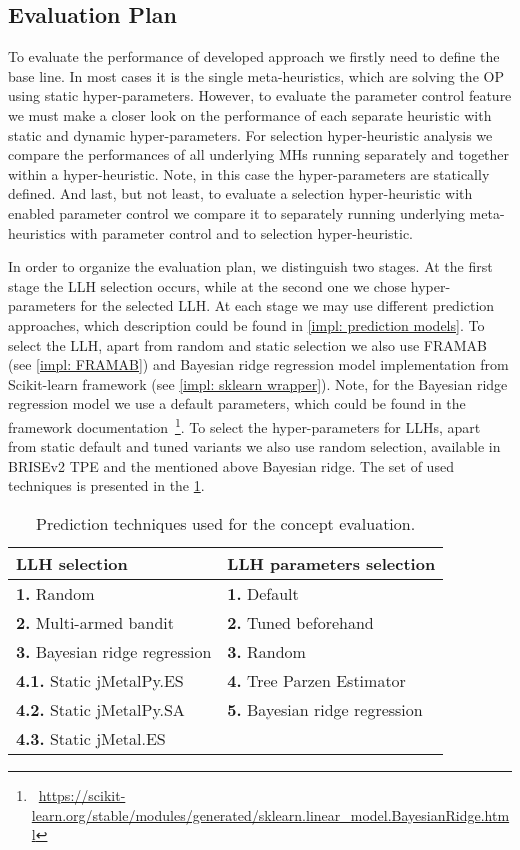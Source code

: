\subsection{Evaluation Plan}\label{eval: concept plan}
To evaluate the performance of developed approach we firstly need to define the base line. In most cases it is the single meta-heuristics, which are solving the OP using static hyper-parameters. However, to evaluate the parameter control feature we must make a closer look on the performance of each separate heuristic with static and dynamic hyper-parameters. For selection hyper-heuristic analysis we compare the performances of all underlying MHs running separately and together within a hyper-heuristic. Note, in this case the hyper-parameters are statically defined. And last, but not least, to evaluate a selection hyper-heuristic with enabled parameter control we compare it to separately running underlying meta-heuristics with parameter control and to selection hyper-heuristic.

In order to organize the evaluation plan, we distinguish two stages.
At the first stage the LLH selection occurs, while at the second one we chose hyper-parameters for the selected LLH. At each stage we may use different prediction approaches, which description could be found in \cref{impl: prediction models}. To select the LLH, apart from random and static selection we also use FRAMAB (see \cref{impl: FRAMAB}) and Bayesian ridge regression model implementation from Scikit-learn framework (see \cref{impl: sklearn wrapper}). Note, for the Bayesian ridge regression model we use a default parameters, which could be found in the framework documentation~\footnote{~\url{https://scikit-learn.org/stable/modules/generated/sklearn.linear_model.BayesianRidge.html}}. To select the hyper-parameters for LLHs, apart from static default and tuned variants we also use random selection, available in BRISEv2 TPE and the mentioned above Bayesian ridge. The set of used techniques is presented in the \cref{eval: concept settings table}.
\begin{table}[h!]
	\centering
	\begin{tabular}{l||l}
		\textbf{LLH selection} & \textbf{LLH parameters selection} \\
		\hline
		\hline
		\textbf{1.} Random & \textbf{1.} Default \\
		\textbf{2.} Multi-armed bandit & \textbf{2.} Tuned beforehand \\
		\textbf{3.} Bayesian ridge regression & \textbf{3.} Random \\
		\textbf{4.1.} Static jMetalPy.ES & \textbf{4.} Tree Parzen Estimator \\
		\textbf{4.2.} Static jMetalPy.SA & \textbf{5.} Bayesian ridge regression\\
		\textbf{4.3.} Static jMetal.ES & 
	\end{tabular}
	
	\caption{Prediction techniques used for the concept evaluation.}
	\label{eval: concept settings table}
\end{table}



